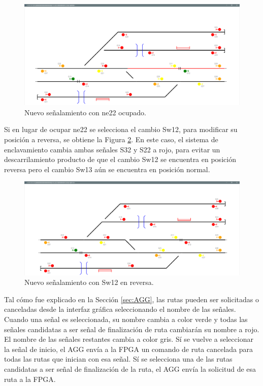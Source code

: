 	\begin{figure}[H]
		\centering
		\includegraphics[origin = c, width=1\textwidth]{resultados-obtenidos/ejemplo1/images/AGG_S32_OCCUPIED}
		\centering\caption{Nuevo señalamiento con ne22 ocupado.}
		\label{fig:EJ1_AGG_S32_OCCUPIED}
	\end{figure}

	Si en lugar de ocupar ne22 se selecciona el cambio Sw12, para modificar su posición a reversa, se obtiene la Figura \ref{fig:EJ1_AGG_SW12_REVERSE}. En este caso, el sistema de enclavamiento cambia ambas señales S32 y S22 a rojo, para evitar un descarrilamiento producto de que el cambio Sw12 se encuentra en posición reversa pero el cambio Sw13 aún se encuentra en posición normal.		
	
	\begin{figure}[H]
		\centering
		\includegraphics[origin = c, width=1\textwidth]{resultados-obtenidos/ejemplo1/images/AGG_S32_NO}
		\centering\caption{Nuevo señalamiento con Sw12 en reversa.}
		\label{fig:EJ1_AGG_SW12_REVERSE}
	\end{figure}
	
	Tal cómo fue explicado en la Sección \ref{sec:AGG}, las rutas pueden ser solicitadas o canceladas desde la interfaz gráfica seleccionando el nombre de las señales. Cuando una señal es seleccionada, su nombre cambia a color verde y todas las señales candidatas a ser señal de finalización de ruta cambiarán su nombre a rojo. El nombre de las señales restantes cambia a color gris. Sí se vuelve a seleccionar la señal de inicio, el AGG envía a la FPGA un comando de ruta cancelada para todas las rutas que inician con esa señal. Sí se selecciona una de las rutas candidatas a ser señal de finalización de la ruta, el AGG envía la solicitud de esa ruta a la FPGA.
	
